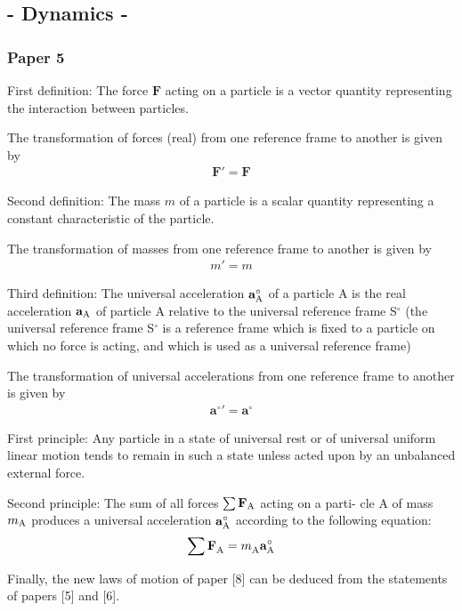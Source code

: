 \documentclass[11pt]{article}
\newcommand{\mm}{m}
\newcommand{\rt}{'}
\newcommand{\vA}{\mathbf{a}}
\newcommand{\vF}{\mathbf{F}}
\newcommand{\ra}{_{\mbox {\scriptsize A}}}
\begin{document}
\bigskip

{\centering\subsection*{- Dynamics -}}

{\centering\subsubsection*{Paper 5}}

\medskip
\par First definition: The force $\vF$ acting on a particle is a vector quantity representing the interaction between particles.
\medskip
\par The transformation of forces (real) from one reference frame to another is given by
\begin{eqnarray*}
\vF\rt = \vF
\end{eqnarray*}
\par Second definition: The mass $\mm$ of a particle is a scalar quantity representing a constant characteristic of the particle.
\medskip
\par The transformation of masses from one reference frame to another is given by
\begin{eqnarray*}
\mm\rt = \mm
\end{eqnarray*}
\par Third definition: The universal acceleration $\vA^{\circ}\ra$ of a particle A is the real acceleration $\vA\ra$ of particle A relative to the universal reference frame S$^{\circ}$ (the universal reference frame S$^{\circ}$ is a reference frame which is fixed to a particle on which no force is acting, and which is used as a universal reference frame)
\medskip
\par The transformation of universal accelerations from one reference frame to another is given by
\begin{eqnarray*}
\vA^{\circ}{\rt} = \vA^{\circ}
\end{eqnarray*}
\par First principle: Any particle in a state of universal rest or of universal uniform linear motion tends to remain in such a state unless acted upon by an unbalanced external force.
\medskip
\par Second principle: The sum of all forces $\sum \vF\ra$ acting on a parti- cle A of mass $\mm\ra$ produces a universal acceleration $\vA^{\circ}\ra$ according to the following equation:
\begin{eqnarray*}
\sum \vF^{\vphantom{\vA\circ}}\ra = \mm^{\vphantom{\vA\circ}}\ra\vA^{\circ}\ra
\end{eqnarray*}
\par Finally, the new laws of motion of paper [8] can be deduced from the statements of papers [5] and [6].
\end{document}
